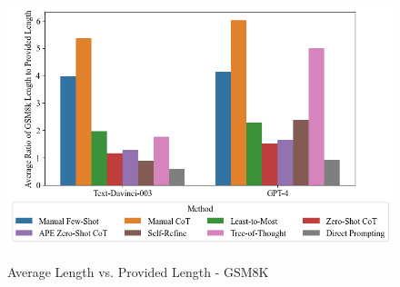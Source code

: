 \documentclass[11pt]{article}
\begin{document}

\begin{figure}
  \caption{Average Length vs. Provided Length - GSM8K}
  \centering
  \includegraphics[width=\textwidth]{../Output for Report/gsm8k_length_vs_provided_means.png}
  \label{fig:gsm8k_len_v_prov}
\end{figure}
\end{document}
